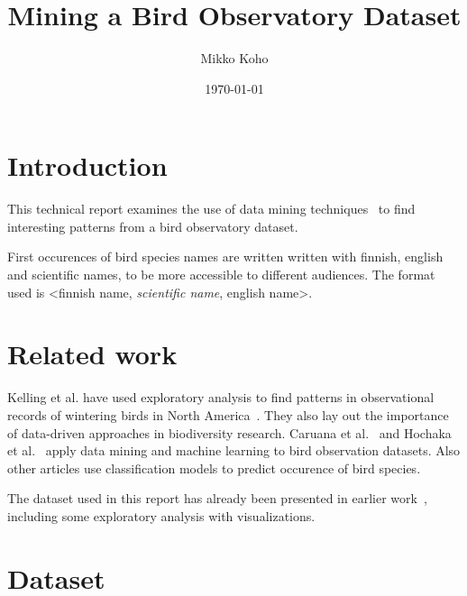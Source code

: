 \documentclass[english]{tktltiki2}
\title{Mining a Bird Observatory Dataset}
\author{Mikko Koho}
\date{\today}
\begin{document}
    

\frontmatter      %

\maketitle        %

\makeabstract     %

\tableofcontents  %


\mainmatter       %


\section{Introduction}

This technical report examines the use of data mining techniques~\cite{tan2006introduction} to find interesting patterns from a bird observatory dataset.

First occurences of bird species names are written written with finnish, english and scientific names, to be more accessible to different audiences. The format used is <finnish name, \emph{scientific name}, english name>.


\section{Related work}

Kelling et al. have used exploratory analysis to find patterns in observational records of wintering birds in North America~\cite{kelling2009data}. They also lay out the importance of data-driven approaches in biodiversity research.
Caruana et al.~\cite{caruana2006mining} and Hochaka et al.~\cite{hochachka2007data} apply data mining and machine learning to bird observation datasets. Also other articles use classification models to predict occurence of bird species\cite{goetz2014relative, mentch2014ensemble}.

The dataset used in this report has already been presented in earlier work~\cite{koho-hyvonen-orni-2014, koho2015gradu}, including some exploratory analysis with visualizations.

\section{Dataset}
\end{document}
